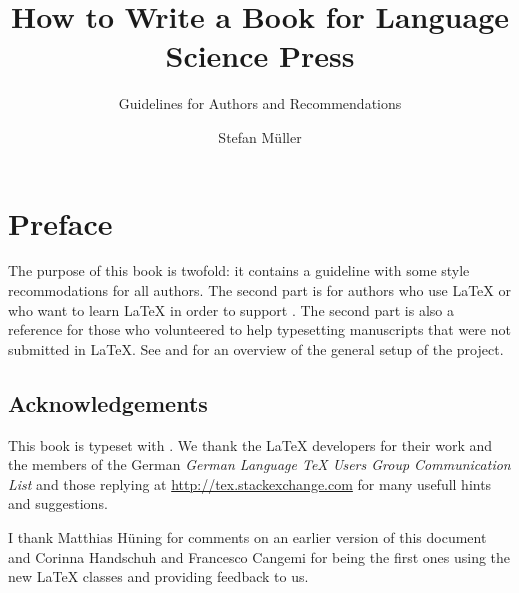 \documentclass[ number=??
                ,series=lnls,
                ,isbn=xxx-x-xxxxxx-xx-x,
                ,url=http://langsci-press.org/catalog/book/14,
	        ,output=long    %
	        ,draftmode  
		  ]{langsci}
\title{How to Write a Book for Language Science Press}
\subtitle{Guidelines for Authors and \latex Recommendations}
\author{Stefan Müller}
\newcommand{\latex}{\LaTeX\xspace}
\begin{document}
               
         
                                                                           
                                  
\maketitle                


\chapter*{Preface}


The purpose of this book is twofold: it contains a guideline with some style recommodations for all
authors. The second part is for authors who use \latex or who want to learn \latex in order to
support \lsp. The second part is also a reference for those who volunteered to help typesetting
manuscripts that were not submitted in \latex. See  and  for an overview of the
general setup of the project.

\section*{Acknowledgements}




This book is typeset with \xelatex. We thank the \latex developers for their work and the members of the German \textit{German
  Language TeX Users Group Communication List} and those replying at \url{http://tex.stackexchange.com} for many usefull hints and suggestions.

I thank Matthias Hüning for comments on an earlier version of this document and Corinna Handschuh
and Francesco Cangemi for being the first ones using the new \latex classes and providing feedback
to us.

\bigskip
\end{document}
